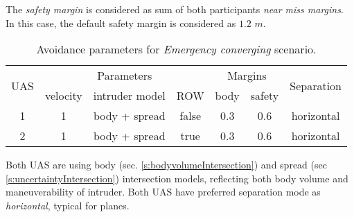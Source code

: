 The \emph{safety margin} is considered as sum of both participants \emph{near miss margins}. In this case, the default safety margin is considered as $1.2$ $m$.

\begin{table}[H]
    \centering
    \begin{tabular}{c||c|c|c||c|c||c}
        \multirow{2}{*}{UAS} & \multicolumn{3}{c||}{Parameters} & \multicolumn{2}{c||}{Margins} & \multirow{2}{*}{Separation}                                            \\\cline{2-6}
                             & velocity & intruder model & ROW        & body & safety \\\hline\hline
        1                    & 1        & body + spread  & false            & 0.3         & 0.6           & horizontal\\\hline
        2                    & 1        & body + spread  & true             & 0.3         & 0.6  & horizontal          \\
    \end{tabular}
    \caption{Avoidance parameters for  \emph{Emergency converging} scenario.}
    \label{tab:aboidanceParametersForEmergencyConvergingScenario}
\end{table}

\begin{note}
 Both UAS are using  body (sec. \ref{s:bodyvolumeIntersection}) and spread (sec \ref{s:uncertaintyIntersection}) intersection models, reflecting both body volume and maneuverability  of intruder. Both UAS have preferred separation mode as \emph{horizontal}, typical for planes.
\end{note}

